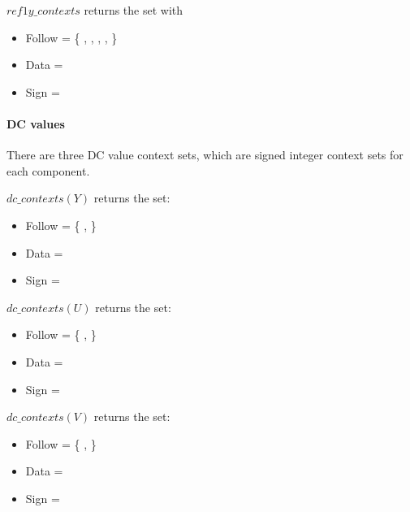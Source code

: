 $ref1y\_contexts$ returns the set with
\begin{itemize}
\item Follow = \{ \RefTwoyFollowOne, \RefTwoyFollowTwo, \RefTwoyFollowThree, \RefTwoyFollowFour, \RefTwoyFollowFivePlus \}
\item Data = \RefTwoyData
\item Sign = \RefTwoySign
\end{itemize}

\paragraph{DC values \\}
\label{dcvaluecontexts}

There are three DC value context sets, which are signed integer context sets for each component. 

$dc\_contexts(Y)$ returns the set:

\begin{itemize}
\item Follow = \{ \YDCFollowOne, \YDCFollowTwoPlus \}
\item Data = \YDCData
\item Sign = \YDCSign
\end{itemize}

$dc\_contexts(U)$ returns the set:

\begin{itemize}
\item Follow = \{ \UDCFollowOne, \UDCFollowTwoPlus \}
\item Data = \UDCData
\item Sign = \UDCSign
\end{itemize}

$dc\_contexts(V)$ returns the set:

\begin{itemize}
\item Follow = \{ \VDCFollowOne, \VDCFollowTwoPlus \}
\item Data = \VDCData
\item Sign = \VDCSign
\end{itemize}